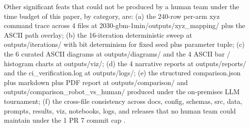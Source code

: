 Other significant feats that could not be produced by a human team
under the time budget of this paper, by category, are: (a) the
240-row per-arm xyz command trace across 4 files at
2030-gbm-1min/outputs/xyz_mapping/ plus the ASCII path overlay; (b)
the 16-iteration deterministic sweep at outputs/iterations/ with
bit determinism for fixed seed plus parameter tuple; (c) the 6
curated ASCII diagrams at outputs/diagrams/ and the 4 ASCII bar /
histogram charts at outputs/viz/; (d) the 4 narrative reports at
outputs/reports/ and the ci_verification.log at outputs/logs/; (e)
the structured comparison.json plus markdown plus PDF report at
outputs/comparison/ and outputs/comparison_robot_vs_human/ produced
under the on-premises LLM tournament; (f) the cross-file consistency
across docs, config, schemas, src, data, prompts, results, viz,
notebooks, logs, and releases that no human team could maintain
under the 1 PR 7 commit cap \cite{claude-opus-47, claude-code,
repo-robotic-surgeries}.
